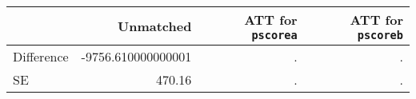 \begin{table}[h!]
\begin{center}
\begin{tabular}{lrrr}
\toprule
& Unmatched & ATT for \texttt{pscorea} & ATT for \texttt{pscoreb}  \\
\hline
Difference & -9756.610000000001 & . & . \\
SE & 470.16 & . & . \\
\bottomrule
\end{tabular}
\end{center}
\end{table}
